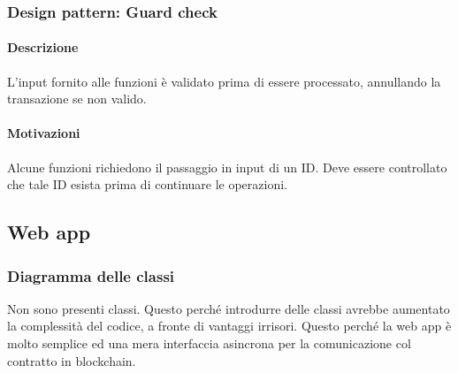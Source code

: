 \documentclass[a4paper, 12pt]{article}
\begin{document}
\subsubsection{Design pattern: Guard check}
\paragraph{Descrizione}
L'input fornito alle funzioni è validato prima di essere processato, annullando la transazione se non valido.
\paragraph{Motivazioni}
Alcune funzioni richiedono il passaggio in input di un ID.
Deve essere controllato che tale ID esista prima di continuare le operazioni.

\newpage
\subsection{Web app}
\subsubsection{Diagramma delle classi}
Non sono presenti classi. Questo perché introdurre delle classi avrebbe aumentato la complessità del codice, a fronte di vantaggi irrisori. Questo perché la web app è molto semplice ed una mera interfaccia asincrona per la comunicazione col contratto in blockchain.
\end{document}
